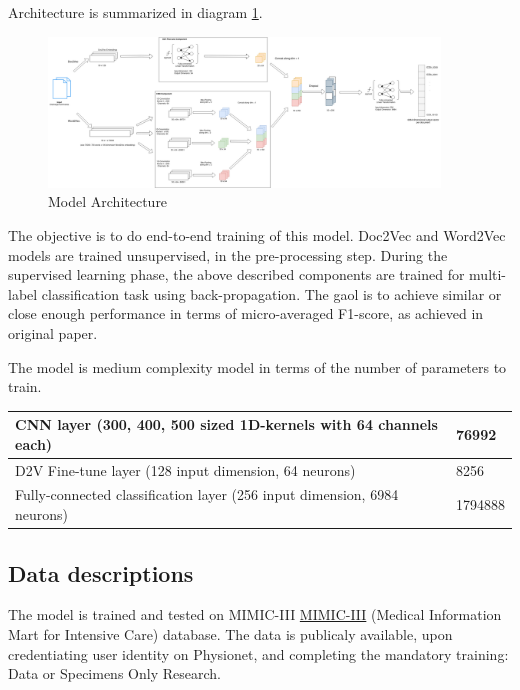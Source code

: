 \documentclass[11pt,a4paper]{article}
\begin{document}
Architecture is summarized in diagram \ref{arch_diag}.

\begin{figure}
  \includegraphics[width=\textwidth,height=4cm]{../src/architecture}
  \caption{Model Architecture}
  \label{arch_diag}
\end{figure}

The objective is to do end-to-end training of this model. Doc2Vec and Word2Vec models are trained unsupervised, in the pre-processing step. During the supervised learning phase, the above described components are trained for multi-label classification task using back-propagation. The gaol is to achieve similar or close enough performance in terms of micro-averaged F1-score, as achieved in original paper.

The model is medium complexity model in terms of the number of parameters to train.
\newline

\begin{tiny}
\begin{tabular}{ ll }
  \hline
  	CNN layer (300, 400, 500 sized 1D-kernels with 64 channels each) & 76992 \\
  \hline
  	D2V Fine-tune layer (128 input dimension, 64 neurons) & 8256 \\
  \hline
  	Fully-connected classification layer (256 input dimension, 6984 neurons) & 1794888 \\
  \hline
\end{tabular}
\end{tiny}

\subsection{Data descriptions}

The model is trained and tested on MIMIC-III \href{https://physionet.org/content/mimiciii/1.4/}{MIMIC-III} (Medical Information Mart for Intensive Care) database. The data is publicaly available, upon credentiating user identity on Physionet, and completing the mandatory training: Data or Specimens Only Research.
\end{document}
